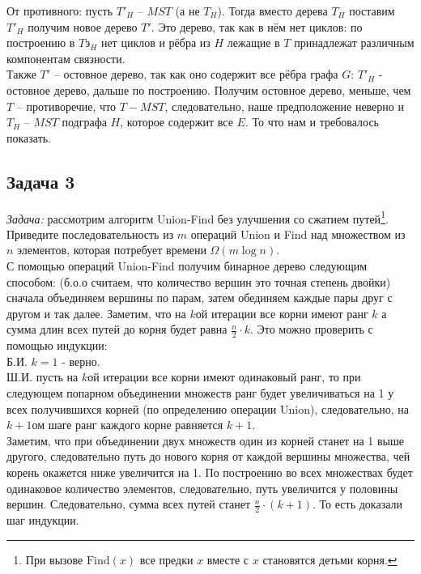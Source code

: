 \documentclass[a4paper,12pt]{article} %
\begin{document}
От противного: пусть $ T'_H $ -- $ MST $ (а не $ T_H $). Тогда вместо дерева $ T_H $ поставим $ T'_H $ получим новое дерево $ T' $. Это дерево, так как в нём нет циклов: по построению в $ Tэ_H $ нет циклов и рёбра из $ H $ лежащие в $  T $ принадлежат различным компонентам связности.\\
Также $ T' $ -- остовное дерево, так как оно содержит все рёбра графа $ G $: $ T'_H $ - остовное дерево, дальше по построению. Получим остовное дерево, меньше, чем $ T $ -- противоречие, что $ T - MST $, следовательно, наше предположение неверно и $ T_H $ -- $ MST $ подграфа $ H $, которое содержит все $ E $. То что нам и требовалось показать.


\subsection*{Задача 3}
\textit{Задача:}  рассмотрим алгоритм Union-Find без улучшения со сжатием путей\footnote{При вызове $\mathrm{Find}(x)$ все предки $x$ вместе с $x$ становятся детьми корня.}. Приведите последовательность из $m$ операций Union и Find над множеством из $n$ элементов, которая потребует времени $\Omega(m\log n)$.\\

С помощью операций Union-Find получим бинарное дерево следующим способом: (б.о.о считаем, что количество вершин это точная степень двойки) сначала объединяем вершины по парам, затем обединяем каждые пары друг с другом и так далее. Заметим, что на $ k $ой итерации все корни имеют ранг $ k $ а сумма длин всех путей до корня будет равна $ \frac{n}{2} \cdot k $. Это можно проверить с помощью индукции:\\

Б.И. $ k = 1 $ - верно.\\
Ш.И. пусть на $ k $ой итерации все корни имеют одинаковый ранг, то при следующем попарном объединении множеств ранг будет увеличиваться на 1 у всех получившихся корней (по определению операции Union), следовательно, на $ k+1 $ом шаге ранг каждого корне равняется $ k+1 $.\\
Заметим, что при объединении двух множеств один из корней станет на 1 выше другого, следовательно путь до нового корня от каждой вершины множества, чей корень окажется ниже увеличится на 1. По построению во всех множествах будет одинаковое количество элементов, следовательно, путь увеличится у половины вершин. Следовательно, сумма всех путей станет $ \frac{n}{2} \cdot (k+1) $. То есть доказали шаг индукции.\\
\end{document}
